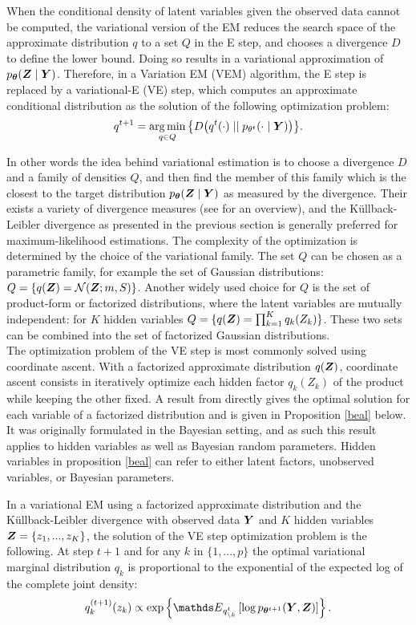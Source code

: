   When the conditional density of latent variables given the observed data cannot be computed, the variational version of the EM reduces the search space of the approximate distribution $q$  to a set $Q$ in the E step, and chooses a divergence $D$ to define the lower bound. Doing so results in a variational approximation of $p_{\boldsymbol{\theta}}({\boldsymbol{Z}}\mid{\boldsymbol{Y}})$. Therefore, in a  Variation EM (VEM) algorithm, the E step is replaced by a variational-E (VE) step, which computes an approximate conditional distribution as the solution of the following optimization problem:
 $$q^{t+1}=\operatorname*{arg\,min}_{q\in Q} \big\{ D\big(q^t(\cdot) \mid\mid p_{\theta^t}(\cdot\mid{\boldsymbol{Y}})\big)\big\}.$$
 
 In other words the idea behind variational estimation is to choose a divergence $D$ and a family of densities $Q$, and then find the member of this family which is the closest to the target distribution $p_{\boldsymbol{\theta}}({\boldsymbol{Z}}\mid{\boldsymbol{Y}})$ as measured by the divergence. Their exists a variety of divergence measures (see \citet{M05} for an overview), and the Küllback-Leibler divergence as presented in the previous section is generally preferred for maximum-likelihood estimations. The complexity of the optimization is determined by the choice of the variational family. The set $Q$ can be chosen as a parametric family, for example the set of Gaussian distributions: $Q=\{q({\boldsymbol{Z}})=\mathcal{N}({\boldsymbol{Z}}; m,S)\}$. Another widely used choice for $Q$ is the set of product-form or factorized distributions, where the latent variables are mutually independent: for $K$ hidden variables $Q=\{q({\boldsymbol{Z}})=\prod_{k=1}^K q_k(Z_k)\}$.  These two sets can be combined into the set of factorized Gaussian distributions. \\ 
 
The optimization problem of the VE step is most commonly solved using coordinate ascent. With a factorized approximate distribution $q({\boldsymbol{Z}})$, coordinate ascent consists in iteratively optimize each hidden factor $q_k(Z_k)$ of the product while keeping the other fixed. A result from \citet{beal} directly gives the optimal solution for each variable of a factorized distribution and is given in Proposition \ref{beal} below. It was originally formulated in the Bayesian setting, and as such this result applies to hidden variables as well as Bayesian random parameters. Hidden variables in proposition \ref{beal} can refer to either latent factors, unobserved variables, or Bayesian parameters.

 \begin{prop}\label{beal}
In a variational EM using a factorized approximate distribution and the Küllback-Leibler divergence with observed data ${\boldsymbol{Y}}$ and $K$ hidden variables ${\boldsymbol{Z}}=\{z_1,...,z_K\}$, the solution of the VE step optimization problem is the following. At step $t+1$ and for any $k$ in $\{1,...,p\}$ the optimal variational marginal distribution $q_k$ is proportional to the exponential of the expected log of the complete joint density:
$$ q_k^{(t+1)}(z_k)  \propto \exp \left\{ \Esp_{q_{\setminus k}^t} \left[ \log p_{\thetabf^{t+1}}(\Ybf, \Zbf) \right] \right\}.$$

\end{prop}

